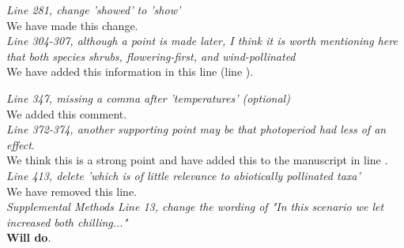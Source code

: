 \documentclass[11pt]{article}
\begin{document}
\emph{Line 281, change 'showed' to 'show'}\\

We have made this change.\\

\emph{Line 304-307, although a point is made later, I think it is worth mentioning here that both species shrubs, flowering-first, and wind-pollinated}\\

We have added this information in this line (line ).

\emph{Line 347, missing a comma after 'temperatures' (optional)}\\

We added this comment.\\

\emph{Line 372-374, another supporting point may be that photoperiod had less of an effect}.\\

We think this is a strong point and have added this to the manuscript in line  .\\


\emph{Line 413, delete 'which is of little relevance to abiotically pollinated taxa'}\\

We have removed this line.\\

\emph{Supplemental Methods Line 13, change the wording of "In this scenario we let increased both chilling..."}\\

\textbf{Will do}.\\

 
\end{document}
